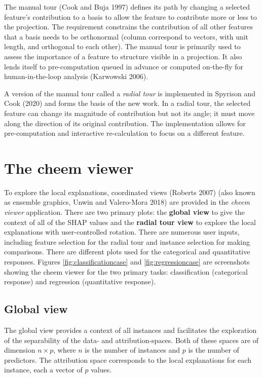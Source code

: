 \documentclass[
]{article}
\begin{document}
The manual tour (Cook and Buja 1997) defines its path by changing a selected feature's contribution to a basis to allow the feature to contribute more or less to the projection. The requirement constrains the contribution of all other features that a basis needs to be orthonormal (column correspond to vectors, with unit length, and orthogonal to each other). The manual tour is primarily used to assess the importance of a feature to structure visible in a projection. It also lends itself to pre-computation queued in advance or computed on-the-fly for human-in-the-loop analysis (Karwowski 2006).

A version of the manual tour called a \emph{radial tour} is implemented in Spyrison and Cook (2020) and forms the basis of the new work. In a radial tour, the selected feature can change its magnitude of contribution but not its angle; it must move along the direction of its original contribution. The implementation allows for pre-computation and interactive re-calculation to focus on a different feature.

\hypertarget{sec:cheemviewer}{%
\section{The cheem viewer}\label{sec:cheemviewer}}

To explore the local explanations, coordinated views (Roberts 2007) (also known as ensemble graphics, Unwin and Valero-Mora 2018) are provided in the \emph{cheem viewer} application. There are two primary plots: the \textbf{global view} to give the context of all of the SHAP values and the \textbf{radial tour view} to explore the local explanations with user-controlled rotation. There are numerous user inputs, including feature selection for the radial tour and instance selection for making comparisons. There are different plots used for the categorical and quantitative responses. Figures \ref{fig:classificationcase} and \ref{fig:regressioncase} are screenshots showing the cheem viewer for the two primary tasks: classification (categorical response) and regression (quantitative response).

\hypertarget{global-view}{%
\subsection{Global view}\label{global-view}}

The global view provides a context of all instances and facilitates the exploration of the separability of the data- and attribution-spaces. Both of these spaces are of dimension \(n\times p\), where \(n\) is the number of instances and \(p\) is the number of predictors. The attribution space corresponds to the local explanations for each instance, each a vector of \(p\) values.
\end{document}
